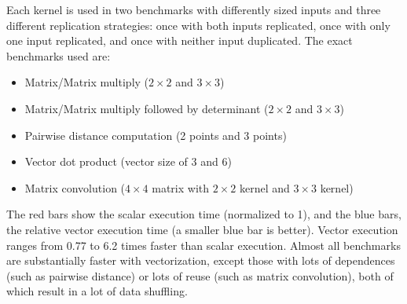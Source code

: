 
Each kernel is used in two benchmarks with differently sized inputs and three different replication strategies: once with both inputs replicated, once with only one input replicated, and once with neither input duplicated. 
The exact benchmarks used are:
\begin{itemize}
    \item Matrix/Matrix multiply ($2 \times 2$ and $3 \times 3$)
    \item Matrix/Matrix multiply followed by determinant ($2 \times 2$ and $3 \times 3$)
    \item Pairwise distance computation (2 points and 3 points)
    \item Vector dot product (vector size of 3 and 6)
    \item Matrix convolution ($4 \times 4$ matrix with $2 \times 2$ kernel and $3 \times 3$ kernel)
\end{itemize}

The red bars show the scalar execution time (normalized to 1), and the blue bars, the relative vector execution time (a smaller blue bar is better).
Vector execution ranges from 0.77 to 6.2 times faster than scalar execution.
Almost all benchmarks are substantially faster with vectorization, except those with lots of dependences (such as pairwise distance) or lots of reuse (such as matrix convolution), both of which result in a lot of data shuffling.


